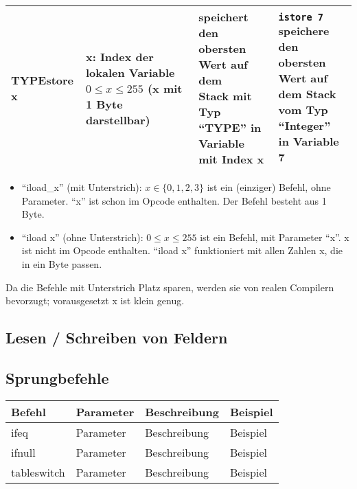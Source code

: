 \begin{table}[h]
\begin{tabular}{l|l|l|l}
		\textbf{TYPE}store x	& \multlineTable{x: Index der lokalen\\ Variable $0 \leq x \leq 255$\\ (x mit 1 Byte darstellbar) }	&	\multlineTable{speichert den obersten Wert auf dem\\ Stack mit Typ \enquote{TYPE} in Variable\\ mit Index x}	& \multlineTable{\texttt{istore 7}\\ speichere den obersten Wert auf\\ dem Stack vom Typ \enquote{Integer}\\ in Variable 7}	\\ \hline		
	\end{tabular}
\end{table}
\begin{itemize}
	\item \enquote{iload\_x} (mit Unterstrich): $x \in \{ 0,1,2,3 \}$ ist ein (einziger) Befehl, ohne Parameter. \enquote{x} ist schon im Opcode enthalten. Der Befehl besteht aus 1 Byte.
	\item \enquote{iload x} (ohne Unterstrich): $0 \leq x \leq 255$ ist ein Befehl, mit Parameter \enquote{x}. x ist nicht im Opcode enthalten. \enquote{iload x} funktioniert mit allen Zahlen x, die in ein Byte passen.
\end{itemize}
Da die Befehle mit Unterstrich Platz sparen, werden sie von realen Compilern bevorzugt; vorausgesetzt x ist klein genug.

\subsection{Lesen / Schreiben von Feldern}

\subsection{Sprungbefehle}
\begin{table}[h]
	\centering
	\label{my-label}
	\begin{tabular}{l|l|l|l}
		Befehl & Parameter & Beschreibung & Beispiel \\ \hline
		
		ifeq & Parameter & Beschreibung & Beispiel \\ \hline
		
		ifnull & Parameter & Beschreibung & Beispiel \\ \hline
		
		tableswitch & Parameter & Beschreibung & Beispiel \\ \hline
		
	\end{tabular}
\end{table}
